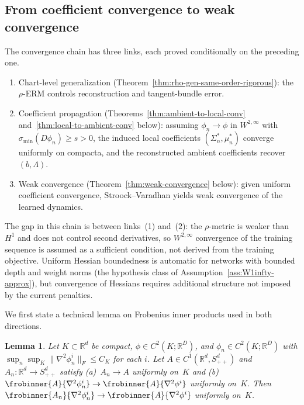 \documentclass[11pt]{article}
\newcommand{\Rd}{\mathbb{R}^d}
\newcommand{\RD}{\mathbb{R}^D}
\newcommand{\norm}[1]{\lVert#1\rVert}
\newcommand{\sigmin}{\sigma_{\min}}
\newtheorem{lem}[thm]{Lemma}
\begin{document}
\subsection{From coefficient convergence to weak convergence}%
\label{sec:convergence}

The convergence chain has three links, each proved
conditionally on the preceding one.
\begin{enumerate}[leftmargin=*,nosep]
\item Chart-level generalization
  (Theorem~\ref{thm:rho-gen-same-order-rigorous}):
  the $\rho$-ERM controls reconstruction and
  tangent-bundle error.
\item Coefficient propagation
  (Theorems~\ref{thm:ambient-to-local-conv}
  and~\ref{thm:local-to-ambient-conv} below):
  assuming $\phi_n\to\phi$ in $W^{2,\infty}$ with
  $\sigmin(D\phi_n)\ge s>0$, the induced local
  coefficients $(\Sigma_n^*,\mu_n^*)$ converge
  uniformly on compacta, and the reconstructed
  ambient coefficients recover $(b,\Lambda)$.
\item Weak convergence
  (Theorem~\ref{thm:weak-convergence} below):
  given uniform coefficient convergence,
  Stroock--Varadhan yields weak convergence of the
  learned dynamics.
\end{enumerate}
The gap in this chain is between links~(1) and~(2):
the $\rho$-metric is weaker than $H^1$ and does not
control second derivatives, so $W^{2,\infty}$
convergence of the training sequence is assumed as a
sufficient condition, not derived from the training
objective.
Uniform Hessian boundedness is automatic for networks
with bounded depth and weight norms (the hypothesis
class of Assumption~\ref{ass:W1infty-approx}), but
convergence of Hessians requires additional structure
not imposed by the current penalties.

\smallskip
We first state a technical lemma on Frobenius inner
products used in both directions.

\begin{lem}\label{lem:frobinner-convergence}
Let $K\subset\Rd$ be compact, $\phi\in C^2(K;\RD)$, and
$\phi_n\in C^2(K;\RD)$ with
$\sup_n\sup_K\norm{\nabla^2\phi_n^i}_F\le C_K$ for
each $i$.
Let $A\in C^1(\Rd,S_{++}^d)$ and
$A_n\!:\Rd\to S_{++}^d$ satisfy
(a)~$A_n\to A$ uniformly on~$K$ and
(b)~$\frobinner{A}{\nabla^2\phi_n^i}
\to\frobinner{A}{\nabla^2\phi^i}$ uniformly on~$K$.
Then $\frobinner{A_n}{\nabla^2\phi_n^i}
\to\frobinner{A}{\nabla^2\phi^i}$ uniformly on~$K$.
\end{lem}
\end{document}
